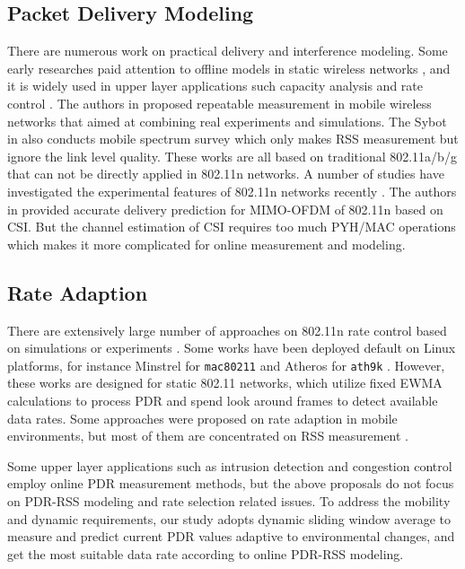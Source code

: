 \documentclass[journal,onecolumn,12pt]{IEEEtran}
\begin{document}
\subsection{Packet Delivery Modeling}
There are numerous work on practical delivery and interference modeling. Some early researches paid attention to offline models in static wireless networks \cite{kolar2011mesh} \cite{reis2006model}, and it is widely used in upper layer applications such capacity analysis \cite{kashyap2007capacity} and rate control \cite{chen2011ram} \cite{judd2008efficient}. The authors in \cite{10.1109/TMC.2009.87} proposed repeatable measurement in mobile wireless networks that aimed at combining real experiments and simulations. The Sybot in \cite{kim2010sybot} also conducts mobile spectrum survey which only makes RSS measurement but ignore the link level quality. These works are all based on traditional 802.11a/b/g that can not be directly applied in 802.11n networks. A number of studies have investigated the experimental features of 802.11n networks recently \cite{Halperin2010predictable} \cite{k.rayanchu:fluid:}. The authors in \cite{Halperin2010predictable} provided accurate delivery prediction for MIMO-OFDM of 802.11n based on CSI. But the channel estimation of CSI \cite{CSI-SF} requires too much PYH/MAC operations which makes it more complicated for online measurement and modeling.

\subsection{Rate Adaption}
There are extensively large number of approaches on 802.11n rate control based on simulations or experiments \cite{kim2009experimental} \cite{Pefkianakis:2010} \cite{zhang2008practical}. Some works have been deployed default on Linux platforms, for instance Minstrel \cite{minstrel} for \texttt{mac80211} and Atheros for \texttt{ath9k} \cite{wong2008wireless}. However, these works are designed for static 802.11 networks, which utilize fixed EWMA calculations to process PDR and spend look around frames to detect available data rates. Some approaches were proposed on rate adaption in mobile environments, but most of them are concentrated on RSS measurement \cite{chen2011ram} \cite{judd2008efficient}.

Some upper layer applications such as intrusion detection \cite{5620919} and congestion control \cite{floyd2000equation} employ online PDR measurement methods, but the above proposals do not focus on PDR-RSS modeling and rate selection related issues. To address the mobility and dynamic requirements, our study adopts dynamic sliding window average to measure and predict current PDR values adaptive to environmental changes, and get the most suitable data rate according to online PDR-RSS modeling.
\end{document}
